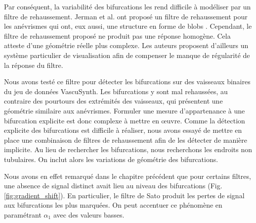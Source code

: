 Par conséquent, la variabilité des bifurcations les rend difficile à modéliser par un filtre de rehaussement. Jerman et al. ont proposé un filtre de rehaussement pour les anévrismes qui ont, eux aussi, une structure en forme de blobs \cite{Jerman2015_blobness}. Cependant, le filtre de rehaussement proposé ne produit pas une réponse homogène. Cela atteste d'une géométrie réelle plus complexe. Les auteurs proposent d'ailleurs un système particulier de visualisation afin de compenser le manque de régularité de la réponse du filtre.

Nous avons testé ce filtre pour détecter les bifurcations sur des vaisseaux binaires du jeu de données VascuSynth. Les bifurcations y sont mal rehaussées, au contraire des pourtours des extrémités des vaisseaux, qui présentent une géométrie similaire aux anévrismes. Formuler une mesure d'appartenance à une bifurcation explicite est donc complexe à mettre en œuvre.  
Comme la détection explicite des bifurcations est difficile à réaliser, nous avons essayé de mettre en place une combinaison de filtres de rehaussement afin de les détecter de manière implicite. Au lieu de rechercher les bifurcations, nous recherchons les endroits non tubulaires. On inclut alors les variations de géométrie des bifurcations.

Nous avons en effet remarqué dans le chapitre précédent que pour certains filtres, une absence de signal distinct avait lieu au niveau des bifurcations (Fig. \ref{fig:gradient_shift}). En particulier, le filtre de Sato produit les pertes de signal aux bifurcations les plus marquées. On peut accentuer ce phénomène en paramétrant $\alpha_1$ avec des valeurs basses. 

